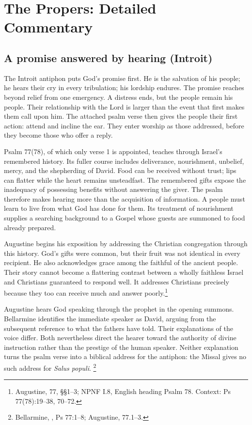 \section{The Propers: Detailed Commentary}

\subsection{A promise answered by hearing (Introit)}

The Introit antiphon puts God's promise first. He is the salvation of his
people; he hears their cry in every tribulation; his lordship endures.
The promise reaches beyond relief from one emergency. A distress ends,
but the people remain his people. Their relationship with the Lord is
larger than the event that first makes them call upon him. The attached
psalm verse then gives the people their first action: attend and incline
the ear. They enter worship as those addressed, before they become those
who offer a reply.

Psalm 77(78), of which only verse 1 is appointed, teaches through Israel's
remembered history. Its fuller course includes deliverance, nourishment,
unbelief, mercy, and the shepherding of David. Food can be received without
trust; lips can flatter while the heart remains unsteadfast. The remembered
gifts expose the inadequacy of possessing benefits without answering the
giver. The psalm therefore makes hearing more than the acquisition of
information. A people must learn to live from what God has done for them.
Its treatment of nourishment supplies a searching background to a Gospel
whose guests are summoned to food already prepared.

Augustine begins his exposition by addressing the Christian congregation
through this history. God's gifts were common, but their fruit was not
identical in every recipient. He also acknowledges grace among the faithful
of the ancient people. Their story cannot become a flattering contrast
between a wholly faithless Israel and Christians guaranteed to respond
well. It addresses Christians precisely because they too can receive much
and answer poorly.\footnote{Augustine,  77,
\S\S1--3; NPNF I.8, English heading Psalm 78. Context: Ps 77(78):19--38,
70--72.}

Augustine hears God speaking through the prophet in the opening summons.
Bellarmine identifies the immediate speaker as David, arguing from the
subsequent reference to what the fathers have told. Their explanations of
the voice differ. Both nevertheless direct the hearer toward the authority
of divine instruction rather than the prestige of the human speaker.
Neither explanation turns the psalm verse into a biblical address for the
antiphon: the Missal gives no such address for \textit{Salus populi}.
\footnote{Bellarmine, , Ps 77:1--8;
Augustine,  77.1--3.}

